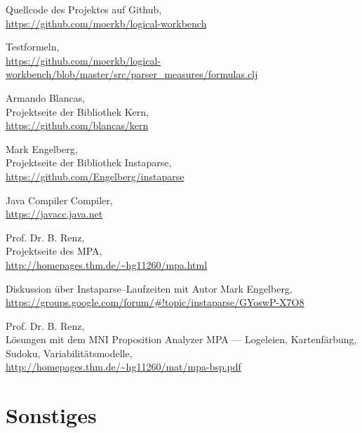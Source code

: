 \documentclass[ngerman,a4paper,abstracton,open=right,twoside=false,toc=listofnumbered,bibtotocnumbered]{scrreprt}
\begin{document}
\appendix

\begin{thebibliography}{7}
		Quellcode des Projektes auf Github,\\
		\url{https://github.com/moerkb/logical-workbench}

		Testformeln,\\
		\url{https://github.com/moerkb/logical-workbench/blob/master/src/parser_measures/formulas.clj}

		Armando Blancas,\\
		Projektseite der Bibliothek Kern, \\
		\url{https://github.com/blancas/kern}

		Mark Engelberg,\\
		Projektseite der Bibliothek Instaparse,\\
		\url{https://github.com/Engelberg/instaparse}

		Java Compiler Compiler,\\
		\url{https://javacc.java.net}

		Prof. Dr. B. Renz,\\
		Projektseite des MPA,\\
		\url{http://homepages.thm.de/~hg11260/mpa.html}

		Diskussion über Instaparse--Laufzeiten mit Autor Mark Engelberg, \\
		\url{https://groups.google.com/forum/#!topic/instaparse/GYoswP-X7O8}

		Prof. Dr. B. Renz,\\
		\glqq{}Lösungen mit dem MNI Proposition Analyzer MPA --- Logeleien, Kartenfärbung, Sudoku, Variabilitätsmodelle\grqq{},\\
		\url{http://homepages.thm.de/~hg11260/mat/mpa-bsp.pdf}
\end{thebibliography}

\clearpage
\begingroup
\let\clearpage\relax
\listoffigures
\listoftables
\endgroup

\chapter{Sonstiges}
\end{document}
